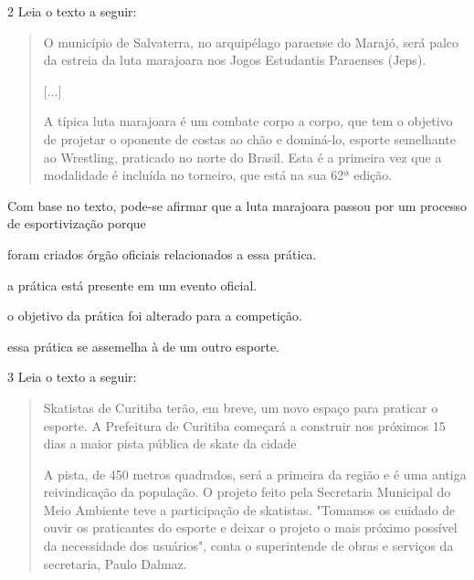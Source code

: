 \num{2} Leia o texto a seguir:

\begin{quote}
O município de Salvaterra, no arquipélago paraense do Marajó, será palco
da estreia da luta marajoara nos Jogos Estudantis Paraenses (Jeps).

{[}...{]}

A típica luta marajoara é um combate corpo a corpo, que tem o objetivo
de projetar o oponente de costas ao chão e dominá-lo, esporte semelhante
ao Wrestling, praticado no norte do Brasil. Esta é a primeira vez que a
modalidade é incluída no torneiro, que está na sua 62ª edição.

\end{quote}

Com base no texto, pode-se afirmar que a luta marajoara passou
por um processo de esportivização porque

\begin{escolha}
\item foram criados órgão oficiais relacionados a essa prática.

\item a prática está presente em um evento oficial.

\item o objetivo da prática foi alterado para a competição.

\item essa prática se assemelha à de um outro esporte.
\end{escolha}

\num{3} Leia o texto a seguir:

\begin{quote}
Skatistas de Curitiba terão, em breve, um novo espaço para praticar o
esporte. A Prefeitura de Curitiba começará a construir nos próximos 15
dias a maior pista pública de skate da cidade 

A pista, de 450 metros quadrados, será a primeira da região e é uma antiga 
reivindicação da população. O projeto feito pela Secretaria Municipal do 
Meio Ambiente teve a participação de skatistas. "Tomamos os cuidado de 
ouvir os praticantes do esporte e deixar o projeto o mais próximo possível 
da necessidade dos usuários", conta o superintende de obras e serviços da 
secretaria, Paulo Dalmaz.


\end{quote}


